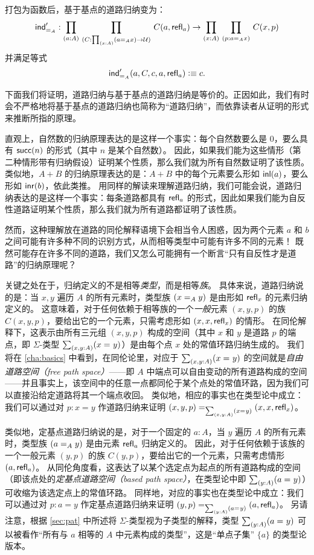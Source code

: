 打包为函数后，基于基点的道路归纳变为：
%
\begin{align*}
  \indidb{A} :  \dprd{a:A}{C : \prd{x:A} (\id[A]{a}{x}) \to \UU}
  C(a,\refl{a}) \to \dprd{x:A}{p : \id[A]{a}{x}} C(x,p) 
\end{align*}
并满足等式
\[ \indidb{A}(a,C,c,a,\refl{a}) \defeq c. \]

下面我们将证明，道路归纳与基于基点的道路归纳是等价的。正因如此，我们有时会不严格地将基于基点的道路归纳也简称为``道路归纳''，而依靠读者从证明的形式来推断所指的原理。

\begin{rmk}\label{rmk:the-only-path-is-refl}
  直观上，自然数的归纳原理表达的是这样一个事实：每个自然数要么是 $0$，要么具有 $\suc(n)$ 的形式（其中 $n$ 是某个自然数）。
  因此，如果我们能为这些情形（第二种情形带有归纳假设）证明某个性质，那么我们就为所有自然数证明了该性质。
  类似地，$A+B$ 的归纳原理表达的是：$A+B$ 中的每个元素要么形如 $\inl(a)$，要么形如 $\inr(b)$，依此类推。
  用同样的解读来理解道路归纳，我们可能会说，道路归纳表达的是这样一个事实：每条道路都具有 $\refl{a}$ 的形式，因此如果我们能为自反性道路证明某个性质，那么我们就为所有道路都证明了该性质。

  然而，这种理解放在道路的同伦解释语境下会相当令人困惑，因为两个元素 $a$ 和 $b$ 之间可能有许多种不同的识别方式，从而相等类型中可能有许多不同的元素！
  既然可能存在许多不同的道路，我们又怎么可能拥有一个断言``只有自反性才是道路''的归纳原理呢？

关键之处在于，归纳定义的不是相等\emph{类型}，而是相等\emph{族}。
具体来说，道路归纳说的是：当 $x, y$ 遍历 $A$ 的所有元素时，类型族 $(\id[A]{x}{y})$ 是由形如 $\refl{x}$ 的元素归纳定义的。
这意味着，对于任何依赖于相等族的一个\emph{一般}元素 $(x, y, p)$ 的族 $C(x, y, p)$，要给出它的一个元素，只需考虑形如 $(x, x, \refl{x})$ 的情形。
在同伦解释下，这表示由所有三元组 $(x, y, p)$ 构成的空间（其中 $x$ 和 $y$ 是道路 $p$ 的端点，即 $\Sigma$-类型 $\sm{x,y:A}(\id{x}{y})$）是由每个点 $x$ 处的常值环路归纳生成的。
我们将在 \cref{cha:basics} 中看到，在同伦论里，对应于 $\sm{x,y:A}(\id{x}{y})$ 的空间就是\emph{自由道路空间（free path space）}——即 $A$ 中端点可以自由变动的所有道路构成的空间——并且事实上，该空间中的任意一点都同伦于某个点处的常值环路，因为我们可以直接沿给定道路将其一个端点收回。
类似地，相应的事实也在类型论中成立：我们可以通过对 $p:x=y$ 作道路归纳来证明 $\id[\sm{x,y:A}(\id{x}{y})]{(x,y,p)}{(x,x,\refl{x})}$。

类似地，定基点道路归纳说的是，对于一个固定的 $a:A$，当 $y$ 遍历 $A$ 的所有元素时，类型族 $(\id[A]{a}{y})$ 是由元素 $\refl{a}$ 归纳定义的。
因此，对于任何依赖于该族的一个一般元素 $(y, p)$ 的族 $C(y, p)$，要给出它的一个元素，只需考虑情形 $(a, \refl{a})$。
从同伦角度看，这表达了以某个选定点为起点的所有道路构成的空间（即该点处的\emph{定基点道路空间（based path space）}，在类型论中即 $\sm{y:A} (\id{a}{y})$）可收缩为该选定点上的常值环路。
同样地，对应的事实也在类型论中成立：我们可以通过对 $p:a=y$ 作定基点道路归纳来证明 $\id[\sm{y:A}(\id{a}{y})]{(y,p)}{(a,\refl{a})}$。
另请注意，根据 \cref{sec:pat} 中所述将 $\Sigma$-类型视为子类型的解释，类型 $\sm{y:A}(\id{a}{y})$ 可以被看作``所有与 $a$ 相等的 $A$ 中元素构成的类型''，这是``单点子集'' $\{a\}$ 的类型论版本。


\end{rmk}
